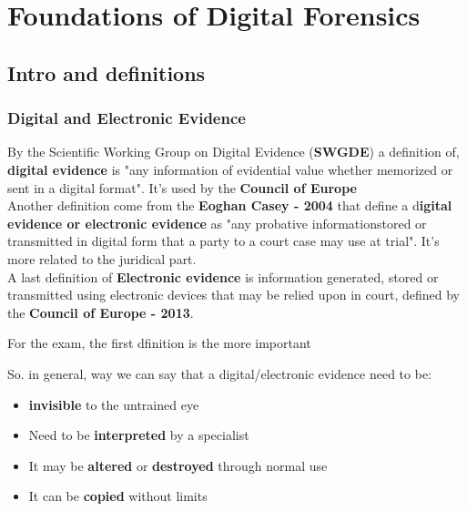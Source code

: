 \chapter{Foundations of Digital Forensics}

\section{Intro and definitions}

\subsection{Digital and Electronic Evidence}

By the Scientific Working Group on Digital Evidence (\textbf{SWGDE}) a definition of, 
\textbf{digital evidence} is "any information of evidential value 
whether memorized or sent in a digital format". It's used by the \textbf{Council of Europe} \\

Another definition come from the \textbf{ Eoghan Casey - 2004} that define 
a d\textbf{igital evidence or electronic evidence} as "any probative informationstored 
or transmitted in digital form that a party to a court case may use at trial". It's more related to the 
juridical part. \\

A last definition of \textbf{Electronic evidence} is information generated, stored or transmitted
using electronic devices that may be relied upon in court, defined by the 
\textbf{Council of Europe - 2013}. \\

\begin{boxH}
    For the exam, the first dfinition is the more important
\end{boxH}

So. in general, way we can say that a digital/electronic evidence need to be:
\begin{itemize}
    \item \textbf{invisible} to the untrained eye
    \item Need to be \textbf{interpreted} by a specialist
    \item It may be \textbf{altered} or \textbf{destroyed} through normal use
    \item It can be \textbf{copied} without limits
\end{itemize} 

